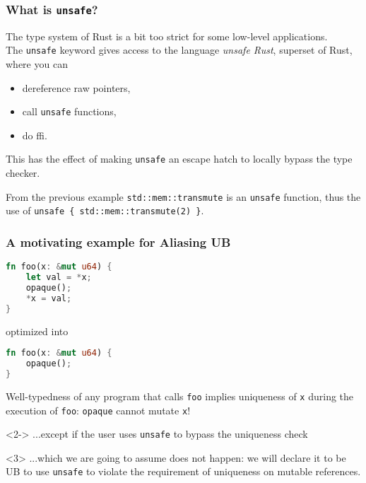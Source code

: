 \begin{frame}[fragile,t]
    \frametitle{What is \texttt{unsafe}?}
    The type system of Rust is a bit too strict for some low-level applications.\\
    The \texttt{unsafe} keyword gives access to the language \textit{unsafe Rust},
    superset of Rust, where you can
    \begin{itemize}
        \item dereference raw pointers,
        \item call \texttt{unsafe} functions,
        \item do ffi.
    \end{itemize}

    This has the effect of making \texttt{unsafe} an escape hatch to locally bypass the type checker.
    \begin{exampleblock}{From the previous example}
        \texttt{std::mem::transmute} is an \texttt{unsafe} function, thus the
        use of \texttt{unsafe \{ std::mem::transmute(2) \}}.
    \end{exampleblock}
\end{frame}

\begin{frame}[fragile, t]
    \frametitle{A motivating example for Aliasing UB}
    \begin{lstlisting}[language=rust]
fn foo(x: &mut u64) {
    let val = *x;
    opaque();
    *x = val;
}
    \end{lstlisting}
    optimized into
    \begin{lstlisting}[language=rust]
fn foo(x: &mut u64) {
    opaque();
}
    \end{lstlisting}
    Well-typedness of any program that calls \texttt{foo} implies uniqueness
    of \texttt{x} during the execution of \texttt{foo}: \texttt{opaque} cannot mutate \texttt{x}!\\
    \begin{onlyenv}<2->
    ...except if the user uses \texttt{unsafe} to bypass the uniqueness check\\
    \end{onlyenv}
    \begin{onlyenv}<3>
    ...which we are going to assume does not happen: we will declare it to be UB
    to use \texttt{unsafe} to violate the requirement of uniqueness on mutable references.
    \end{onlyenv}
\end{frame}

